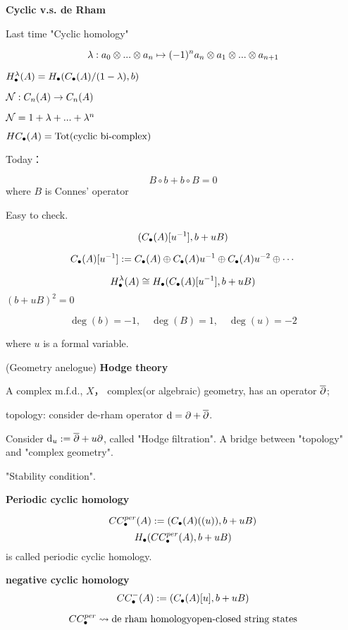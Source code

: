 
\textbf{Cyclic v.s. de Rham}

Last time "Cyclic homology"

$$\lambda:a_0\otimes...\otimes a_n\mapsto(-1)^n a_n\otimes a_1\otimes...\otimes a_{n+1}$$

$H^{\lambda}_{\bullet}(A)=H_{\bullet}(C_{\bullet}(A)/(1-\lambda),b)$

$\mathcal{N}:C_n(A)\to C_n(A)$

$\mathcal{N}=1+\lambda+...+\lambda^n$

$HC_{\bullet}(A)=\text{Tot}\text{(cyclic bi-complex)}$

Today：

\begin{prop}
$$B\circ b+b\circ B=0$$
where $B$ is Connes' operator
\end{prop}

Easy to check.

$$(C_{\bullet}(A)[u^{-1}],b+uB)$$

$$C_{\bullet}(A)[u^{-1}]:=C_{\bullet}(A)\oplus C_{\bullet}(A)u^{-1}
\oplus C_{\bullet}(A)u^{-2}\oplus\cdots$$

\begin{prop}
$$H_{\bullet}^{\lambda}(A)\cong H_{\bullet}(C_{\bullet}(A)[u^{-1}],b+uB)$$
$(b+uB)^2=0$

$$\deg(b)=-1,\quad\deg(B)=1,\quad\deg(u)=-2$$

where $u$ is a formal variable.
\end{prop}

\begin{rem}(Geometry anelogue)
\textbf{Hodge theory}

A complex m.f.d., $X$， complex(or algebraic) geometry,
has an operator $\overline{\partial}$;

topology: consider de-rham operator $\mathrm{d}=\partial+\overline{\partial}$.

Consider $\mathrm{d}_u:=\overline{\partial}+u\partial$, called "Hodge filtration".
A bridge between "topology" and "complex geometry".

"Stability condition".
\end{rem}

\textbf{Periodic cyclic homology}

$$CC^{per}_{\bullet}(A):=(C_{\bullet}(A)((u)),b+uB)$$
$$H_{\bullet}(CC^{per}_{\bullet}(A),b+uB)$$
is called periodic cyclic homology.

\textbf{negative cyclic homology}
$$CC^-_{\bullet}(A):=(C_{\bullet}(A)[u],b+uB)$$

$$CC_{\bullet}^{per}\rightsquigarrow\text{de rham homology}
\text{open-closed string states}$$

